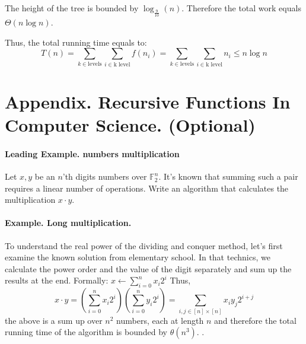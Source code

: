  The height of the tree is bounded by \( \log_{\frac{9}{10}} \left(n\right) \). Therefore the total work equals \( \Theta \left( n\log n \right) \).    

Thus, the total running time equals to:
\begin{equation*}
    T(n) = \sum_{k \in \text{levels}}{\sum_{i \in \text{k level}}{f\left(n_i\right)}} = \sum_{k \in \text{levels}}{\sum_{i \in \text{k level}}{n_i}} \le n\log n  
\end{equation*}



\section{Appendix. Recursive Functions In Computer Science. (Optional)}



\paragraph{Leading Example. numbers multiplication}
Let \(x,y\) be an \(n\)'th digits numbers over \( \mathbb{F}^{n}_{2} \). It's known that summing such a pair requires a linear number of operations. Write an algorithm that calculates the multiplication \(x\cdot y\). 

\paragraph{Example. Long multiplication.} 
To understand the real power of the dividing and conquer method, let's first examine the known solution from elementary school.  In that technics, we calculate the power order and the value of the digit separately and sum up the results at the end. Formally: \(x \leftarrow \sum_{i=0}^{n}{x_{i}2^{i}}\) Thus, \[ x\cdot y =\left( \sum_{i=0}^{n}{x_{i}2^{i}} \right) \left( \sum_{i=0}^{n}{y_{i}2^{i}} \right) =  \sum_{i,j \in [n]\times[n] }{ x_{i}y_{j}2^{i+j} }\] the above is a sum up over \(n^2\) numbers, each at length \(n\) and therefore the total running time of the algorithm is bounded by \( \theta(n^3) \). .

